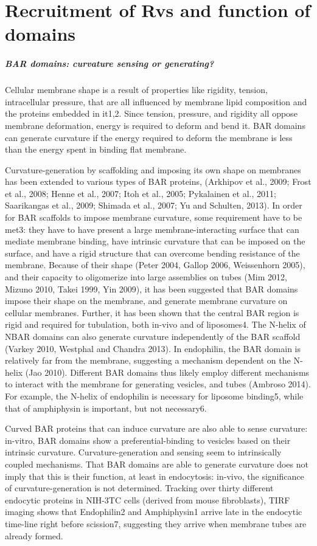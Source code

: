 \section{Recruitment of Rvs and function of domains} 

	\subparagraph{BAR domains: curvature sensing or generating? }
	Cellular membrane shape is a result of properties like rigidity, tension, intracellular pressure, that are all influenced by membrane lipid composition and the proteins embedded in it1,2. Since tension, pressure, and rigidity all oppose membrane deformation, energy is required to deform and bend it. BAR domains can generate curvature if the energy required to deform the membrane is less than the energy spent in binding flat membrane.

	\vspace{5mm}
			
	Curvature-generation by scaffolding and imposing its own shape on membranes has been extended to various types of BAR proteins, (Arkhipov et al., 2009; Frost et al., 2008; Henne et al., 2007; Itoh et al., 2005; Pykalainen et al., 2011; Saarikangas et al., 2009; Shimada et al., 2007; Yu and Schulten, 2013). In order for BAR scaffolds to impose membrane curvature, some requirement have to be met3: they have to have present a large membrane-interacting surface that can mediate membrane binding, have intrinsic curvature that can be imposed on the surface, and have a rigid structure that can overcome bending resistance of the membrane. Because of their shape (Peter 2004, Gallop 2006, Weissenhorn 2005), and their capacity to oligomerize into large assemblies on tubes (Mim 2012, Mizuno 2010, Takei 1999, Yin 2009), it has been suggested that BAR domains impose their shape on the membrane, and generate membrane curvature on cellular membranes. Further, it has been shown that the central BAR region is rigid and required for tubulation, both in-vivo and of liposomes4. The N-helix of NBAR domains can also generate curvature independently of the BAR scaffold (Varkey 2010, Westphal and Chandra 2013). In endophilin, the BAR domain is relatively far from the membrane, suggesting a mechanism dependent on the N-helix (Jao 2010). Different BAR domains thus likely employ different mechanisms to interact with the membrane for generating vesicles, and tubes (Ambroso 2014). For example, the N-helix of endophilin is necessary for liposome binding5, while that of amphiphysin is important, but not necessary6. 


	\vspace{5mm}
	Curved BAR proteins that can induce curvature are also able to sense curvature: in-vitro, BAR domains show a preferential-binding to vesicles based on their intrinsic curvature. Curvature-generation and sensing seem to intrinsically coupled mechanisms. That BAR domains are able to generate curvature does not imply that this is their function, at least in endocytosis: in-vivo, the significance of curvature-generation is not determined. Tracking over thirty different endocytic proteins in NIH-3TC cells (derived from mouse fibroblasts), TIRF imaging shows that Endophilin2 and Amphiphysin1 arrive late in the endocytic time-line right before scission7, suggesting they arrive when membrane tubes are already formed. 


